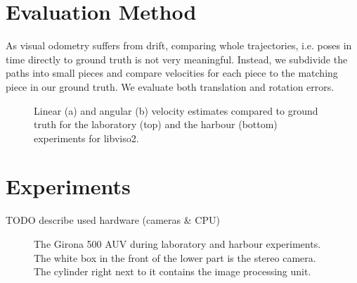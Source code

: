 \documentclass[conference]{IEEEtran}
\begin{document}
\section{Evaluation Method
  \label{evaluation-method}
}

As visual odometry suffers from drift, comparing whole trajectories, i.e. poses in time directly to ground truth is not very meaningful. Instead, we subdivide the paths into small pieces and compare velocities for each piece to the matching piece in our ground truth. We evaluate both translation and rotation errors.

\begin{figure}
  \begin{center}
  \end{center}
  \caption{Linear (a) and angular (b) velocity estimates compared to ground truth for the laboratory (top) and the harbour (bottom) experiments for libviso2.}
  \label{error-plots}
\end{figure}


\section{Experiments
  \label{experiments}
}

TODO describe used hardware (cameras \& CPU)
\begin{figure}
  \noindent{}
  \caption{The Girona 500 AUV during laboratory and harbour experiments. The white box in the front of the lower part is the stereo camera. The cylinder right next to it contains the image processing unit.}
  \label{g500}
\end{figure}
\end{document}
